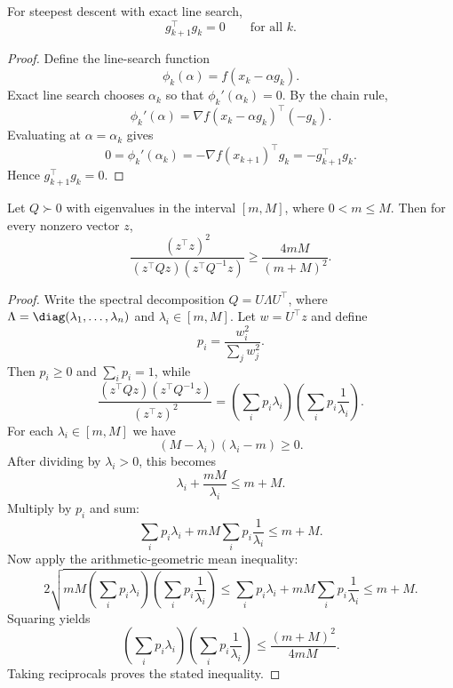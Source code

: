 \begin{proposition}\label{prop:l2-orthogonality-of-consecutive-gradients}
	For steepest descent with exact line search,
	\[
		g_{k+1}^\top g_k=0
		\qquad \text{for all } k.
	\]
\end{proposition}
\begin{proof}
	Define the line-search function
	\[
		\phi_k(\alpha)=f(x_k-\alpha g_k).
	\]
	Exact line search chooses $\alpha_k$ so that $\phi_k'(\alpha_k)=0$. By the chain rule,
	\[
		\phi_k'(\alpha)
		=
		\nabla f(x_k-\alpha g_k)^\top (-g_k).
	\]
	Evaluating at $\alpha=\alpha_k$ gives
	\[
		0=\phi_k'(\alpha_k)
		=
		-\nabla f(x_{k+1})^\top g_k
		=
		-g_{k+1}^\top g_k.
	\]
	Hence $g_{k+1}^\top g_k=0$.
\end{proof}

\begin{lemma}\label{lem:l2-kantorovich-inequality-in-scalar-form}
	Let $Q \succ 0$ with eigenvalues in the interval $[m,M]$, where $0<m \le M$. Then for every nonzero vector $z$,
	\[
		\frac{(z^\top z)^2}{(z^\top Qz)(z^\top Q^{-1}z)}
		\ge
		\frac{4mM}{(m+M)^2}.
	\]
\end{lemma}
\begin{proof}
	Write the spectral decomposition $Q=U \Lambda U^\top$, where $\Lambda=\diag(\lambda_1,\dots,\lambda_n)$ and $\lambda_i \in [m,M]$. Let $w=U^\top z$ and define
	\[
		p_i=\frac{w_i^2}{\sum_j w_j^2}.
	\]
	Then $p_i \ge 0$ and $\sum_i p_i=1$, while
	\[
		\frac{(z^\top Qz)(z^\top Q^{-1}z)}{(z^\top z)^2}
		=
		\left(\sum_i p_i \lambda_i\right)\left(\sum_i p_i \frac{1}{\lambda_i}\right).
	\]
	For each $\lambda_i \in [m,M]$ we have
	\[
		(M-\lambda_i)(\lambda_i-m)\ge 0.
	\]
	After dividing by $\lambda_i>0$, this becomes
	\[
		\lambda_i+\frac{mM}{\lambda_i}\le m+M.
	\]
	Multiply by $p_i$ and sum:
	\[
		\sum_i p_i \lambda_i + mM \sum_i p_i \frac{1}{\lambda_i}\le m+M.
	\]
	Now apply the arithmetic-geometric mean inequality:
	\[
		2\sqrt{
			mM
			\left(\sum_i p_i \lambda_i\right)
			\left(\sum_i p_i \frac{1}{\lambda_i}\right)
		}
		\le
		\sum_i p_i \lambda_i + mM \sum_i p_i \frac{1}{\lambda_i}
		\le
		m+M.
	\]
	Squaring yields
	\[
		\left(\sum_i p_i \lambda_i\right)\left(\sum_i p_i \frac{1}{\lambda_i}\right)
		\le
		\frac{(m+M)^2}{4mM}.
	\]
	Taking reciprocals proves the stated inequality.
\end{proof}

